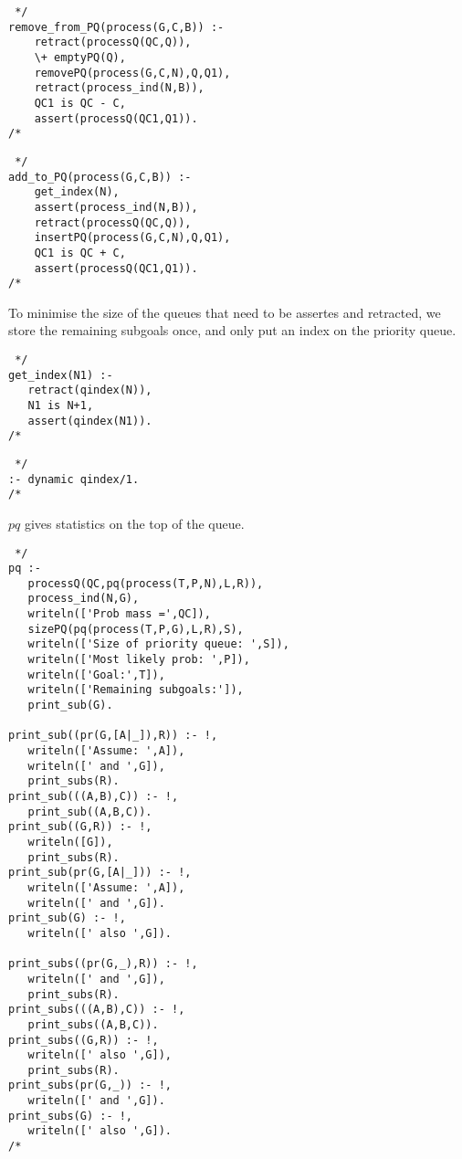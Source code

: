 \begin{verbatim} */
remove_from_PQ(process(G,C,B)) :-
    retract(processQ(QC,Q)),
    \+ emptyPQ(Q),    
    removePQ(process(G,C,N),Q,Q1),
    retract(process_ind(N,B)),
    QC1 is QC - C,
    assert(processQ(QC1,Q1)).  
/* \end{verbatim}

\begin{verbatim} */
add_to_PQ(process(G,C,B)) :-
    get_index(N),
    assert(process_ind(N,B)),
    retract(processQ(QC,Q)),
    insertPQ(process(G,C,N),Q,Q1),
    QC1 is QC + C,
    assert(processQ(QC1,Q1)).
/* \end{verbatim}

To minimise the size of the queues that need to be assertes and retracted, we
store the remaining subgoals once, and only put an index on the priority queue.

\begin{verbatim} */
get_index(N1) :-
   retract(qindex(N)),
   N1 is N+1,
   assert(qindex(N1)).
/* \end{verbatim}

\begin{verbatim} */
:- dynamic qindex/1.
/* \end{verbatim}

$pq$ gives statistics on the top of the queue.

\begin{verbatim} */
pq :-
   processQ(QC,pq(process(T,P,N),L,R)),
   process_ind(N,G),
   writeln(['Prob mass =',QC]),
   sizePQ(pq(process(T,P,G),L,R),S),
   writeln(['Size of priority queue: ',S]),
   writeln(['Most likely prob: ',P]),
   writeln(['Goal:',T]),
   writeln(['Remaining subgoals:']),
   print_sub(G).

print_sub((pr(G,[A|_]),R)) :- !,
   writeln(['Assume: ',A]),
   writeln([' and ',G]),
   print_subs(R).
print_sub(((A,B),C)) :- !,
   print_sub((A,B,C)).
print_sub((G,R)) :- !,
   writeln([G]),
   print_subs(R).
print_sub(pr(G,[A|_])) :- !,
   writeln(['Assume: ',A]),
   writeln([' and ',G]).
print_sub(G) :- !,
   writeln([' also ',G]).

print_subs((pr(G,_),R)) :- !,
   writeln([' and ',G]),
   print_subs(R).
print_subs(((A,B),C)) :- !,
   print_subs((A,B,C)).
print_subs((G,R)) :- !,
   writeln([' also ',G]),
   print_subs(R).
print_subs(pr(G,_)) :- !,
   writeln([' and ',G]).
print_subs(G) :- !,
   writeln([' also ',G]).
/* \end{verbatim}

